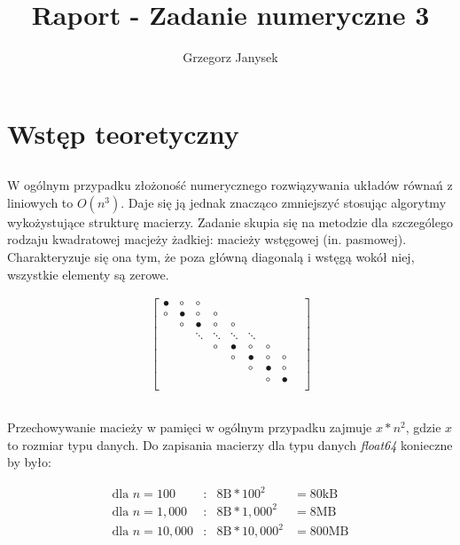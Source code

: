 \documentclass[11pt]{extarticle}
\author{Grzegorz Janysek}
\title{Raport - Zadanie numeryczne 3}
\begin{document}
	\maketitle

	\section{Wstęp teoretyczny}
	
	\subsection{}

	W ogólnym przypadku złożoność numerycznego rozwiązywania układów równań z liniowych to \(O(n^3)\).
	Daje się ją jednak znacząco zmniejszyć stosując algorytmy wykożystujące strukturę macierzy.
	Zadanie skupia się na metodzie dla szczególego rodzaju kwadratowej macjeży żadkiej: macieży wstęgowej (in. pasmowej). 
	Charakteryzuje się ona tym, że poza główną diagonalą i wstęgą wokół niej, wszystkie elementy są zerowe.
	
	\begin{align}
		\begin{bmatrix}
								\bullet	&	\circ	&	\circ	\\
					\circ	&	\bullet	&	\circ	&	\circ	\\
			&		\circ	&	\bullet	&	\circ	&	\circ	\\
			&&		\ddots	&	\ddots	&	\ddots	&	\ddots	\\
			&&&		\circ	&	\bullet	&	\circ	&	\circ	\\
			&&&&	\circ	&	\bullet	&	\circ	&	\circ	\\
			&&&&&	\circ	&	\bullet &	\circ	\\
			&&&&&&	\circ	&	\bullet	&	\\
		\end{bmatrix}
	\end{align}
	
	\subsection{}

	Przechowywanie macieży w pamięci w ogólnym przypadku zajmuje \(x*n^2\), gdzie \(x\) to rozmiar typu danych.
	Do zapisania macierzy dla typu danych \emph{float64} konieczne by było: 

	\begin{align}
		\text{dla } n=100 &:& 8\text{B}*100^2 &= 80\text{kB} \\
		\text{dla } n=1,000 &:& 8\text{B}*1,000^2 &= 8\text{MB} \\
		\text{dla } n=10,000 &:& 8\text{B}*10,000^2 &= 800\text{MB}
	\end{align}
\end{document}
